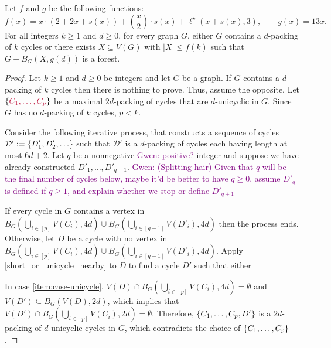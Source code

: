 \documentclass{patmorin}
\newcommand{\gwen}[1]{\textcolor{Purple}{Gwen: #1}}
\DeclarePairedDelimiter\set{\{}{\}}
\begin{document}
\begin{thm}\label{thm:the-big-ball-of-wax}
  Let $f$ and $g$ be the following functions:
  \[
    \textstyle f(x)=
  x\cdot (2+2x+s(x)) + \binom{x}{2}\cdot s(x) + \ell^\star(x+s(x),3), \qquad
    g(x)= 13x.
  \]
  For all integers $k\ge 1$ and $d\ge 0$, for every graph $G$, either $G$ contains a $d$-packing of $k$ cycles or there exists $X\subseteq V(G)$ with $|X|\leq f(k)$ such that $G-B_G(X,g(d))$ is a forest.
\end{thm}

\begin{proof}
  Let $k\ge 1$ and $d\ge 0$ be integers and let $G$ be a graph. If $G$ contains a $d$-packing of $k$ cycles then there is nothing to prove. Thus, assume the opposite. Let $\set{\mathdefin{C_1,\ldots,C_p}}$ be a maximal $2d$-packing of cycles that are $d$-unicyclic in $G$.  Since $G$ has no $d$-packing of $k$ cycles, $p<k$.

  Consider the following iterative process, that
  constructs a sequence of cycles 
  $\mathcal{D}':=\set{D'_1,D'_2,\ldots}$ such that $\mathcal{D}'$ is a $d$-packing of cycles each having length at most $6d+2$. Let $q$ be a nonnegative \gwen{positive?} integer and suppose we have already constructed $D'_1,\ldots,D'_{q-1}$. 
  \gwen{(Splitting hair) Given that $q$ will be the final number of cycles below, maybe it'd be better to have $q \geq 0$, assume $D'_q$ is defined if $q\geq 1$, and explain whether we stop or define $D'_{q+1}$}

  If every cycle in $G$ contains a vertex in  $B_G(\bigcup_{i\in[p]} V(C_i),4d)\cup B_G(\bigcup_{i\in[q-1]}V(D'_i),4d)$ then the process ends.  Otherwise, let $D$ be a cycle with no vertex in $B_G(\bigcup_{i\in[p]} V(C_i),4d)\cup B_G(\bigcup_{i\in[q-1]}V(D'_i),4d)$.   Apply \cref{short_or_unicycle_nearby} to $D$ to find a cycle $D'$ such that either 
   In case \cref{item:case-unicycle},
   $V(D)\cap B_G(\bigcup_{i\in[p]} V(C_i),4d)=\emptyset$ and $V(D')\subseteq B_G(V(D),2d)$, which implies that $V(D')\cap B_G(\bigcup_{i\in[p]} V(C_i),2d)=\emptyset$. Therefore, $\set{C_1,\ldots,C_p,D'}$ is a $2d$-packing of $d$-unicyclic cycles in $G$, which contradicts the choice of $\set{C_1,\ldots,C_p}$.
   

\end{proof}
\end{document}
